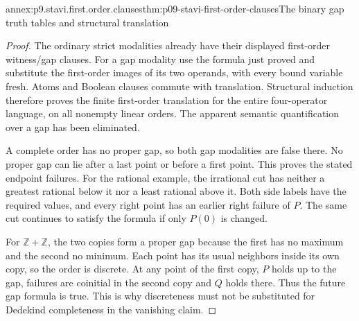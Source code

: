 \begin{annexitem}{annex:p9.stavi.first.order.clauses}{thm:p09-stavi-first-order-clauses}{The binary gap truth tables and structural translation}
\begin{proof}
The ordinary strict modalities already
have their displayed first-order
witness/gap clauses. For a gap
modality use the formula just proved
and substitute the first-order images
of its two operands, with every
bound variable fresh. Atoms and
Boolean clauses commute with
translation. Structural induction
therefore proves the finite
first-order translation for the
entire four-operator language,
on all nonempty linear orders.
The apparent semantic quantification
over a gap has been eliminated.

A complete order has no proper gap,
so both gap modalities are false
there. No proper gap can lie
after a last point or before a
first point. This proves the
stated endpoint failures.
For the rational example, the
irrational cut has neither a
greatest rational below it nor
a least rational above it.
Both side labels have the
required values, and every
right point has an earlier
right failure of \(P\).
The same cut continues to
satisfy the formula if only
\(P(0)\) is changed.

For \(\mathbb Z+\mathbb Z\),
the two copies form a proper
gap because the first has no
maximum and the second no
minimum. Each point has its
usual neighbors inside its own
copy, so the order is discrete.
At any point of the first
copy, \(P\) holds up to the
gap, failures are coinitial
in the second copy and \(Q\)
holds there. Thus the future
gap formula is true. This
is why discreteness must
not be substituted for
Dedekind completeness in
the vanishing claim.
\end{proof}
\end{annexitem}

